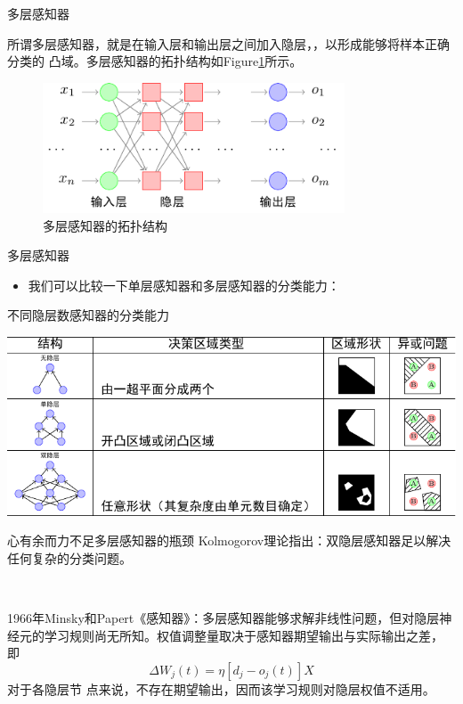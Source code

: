 \documentclass[xcolor=svgnames]{beamer}
\begin{document}
\begin{frame}{多层感知器}

  \setlength\parindent{2em}
  
  所谓多层感知器，就是在输入层和输出层之间加入隐层，，以形成能够将样本正确分类的
  凸域。多层感知器的拓扑结构如Figure\ref{fig:mullayer}所示。
  
  \centering
  \begin{figure}
    \includegraphics[width=0.8\textwidth]{fig04.pdf}
    \caption{多层感知器的拓扑结构}
    \label{fig:mullayer}    
  \end{figure}
\end{frame}

\begin{frame}{多层感知器}
  \begin{itemize}
  \item 我们可以比较一下单层感知器和多层感知器的分类能力：
  \end{itemize}
  \begin{table}
    \centering
    \caption{不同隐层数感知器的分类能力}
    \label{fig:different}
    \includegraphics[width=\textwidth]{fig03.pdf}
  \end{table}
\end{frame}

\begin{frame}{心有余而力不足\pozhehao 多层感知器的瓶颈}
  Kolmogorov理论指出：\alert{双隐层感知器足以解决任何复杂的分类问题。}

  ~

  1966年Minsky和Papert《感知器》：\alert{多层感知器能够求解非线性问题，但对隐层神
    经元的学习规则尚无所知。}权值调整量取决于感知器期望输出与实际输出之差，
  即\begin{equation} \Delta W_j(t) = \eta[d_j-o_j(t)]X \end{equation}对于各隐层节
  点来说，不存在期望输出，因而该学习规则对隐层权值不适用。
\end{frame}
\end{document}
